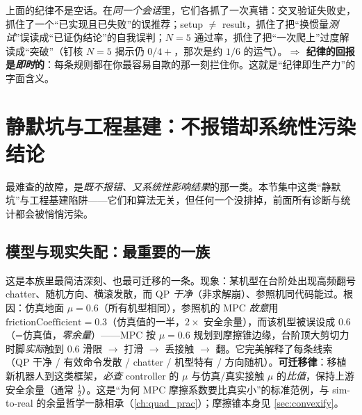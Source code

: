 \begin{insight}\label{ins:ld-discipline}
上面的纪律不是空话。在\emph{同一个会话}里，它们各抓了一次真错：交叉验证失败史，抓住了一个“已实现且已失败”的误推荐；setup $\ne$ result，抓住了把“换惯量\emph{测试}”误读成“已证伪结论”的自我误判；$N=5$ 通过率，抓住了把“一次爬上”过度解读成“突破”（钉核 $N=5$ 揭示仍 $0/4+$，那次是约 $1/6$ 的运气）。\textbf{$\Rightarrow$ 纪律的回报是\emph{即时}的}：每条规则都在你最容易自欺的那一刻拦住你。这就是“纪律即生产力”的字面含义。
\end{insight}

\section{静默坑与工程基建：不报错却系统性污染结论}
\label{sec:ld-silent}

最难查的故障，是\emph{既不报错、又系统性影响结果}的那一类。本节集中这类“静默坑”与工程基建陷阱——它们和算法无关，但任何一个没排掉，前面所有诊断与统计都会被悄悄污染。

\subsection{模型与现实失配：最重要的一族}
\label{subsec:ld-silent-mismatch}

\begin{insight}\label{ins:ld-mu-margin}
这是本族里最简洁深刻、也最可迁移的一条。现象：某机型在台阶处出现高频翻号 chatter、随机方向、横滚发散，而 QP \emph{干净}（非求解崩）、参照机同代码能过。根因：仿真地面 $\mu=0.6$（所有机型相同），参照机的 MPC \emph{故意}用 $\mathrm{frictionCoefficient}=0.3$（仿真值的一半，$2\times$ 安全余量），而该机型被误设成 $0.6$（=仿真值，\emph{零余量}）——MPC 按 $\mu=0.6$ 规划到摩擦锥边缘，台阶顶大剪切力时脚\emph{实际}触到 $0.6$ 滑限 $\to$ 打滑 $\to$ 丢接触 $\to$ 翻。它完美解释了每条线索（QP 干净 / 有效命令发散 / chatter / 机型特有 / 方向随机）。\textbf{可迁移律}：移植新机器人到这类框架，\emph{必查} controller 的 $\mu$ 与仿真/真实接触 $\mu$ 的\emph{比值}，保持上游安全余量（通常 $\tfrac12$）。这是“为何 MPC 摩擦系数要比真实小”的标准范例，与 sim-to-real 的余量哲学一脉相承（\cref{ch:quad_prac}）；摩擦锥本身见 \cref{sec:convexify}。
\end{insight}

